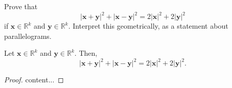 \begin{exercise}
	Prove that
	\begin{equation*}
	\left|\textbf{x}+\textbf{y}\right|^2+\left|\textbf{x}-\textbf{y}\right|^2=2\left|\textbf{x}\right|^2+2\left|\textbf{y}\right|^2
	\end{equation*}
	if $\textbf{x}\in\mathbb{R}^k$ and $\textbf{y}\in\mathbb{R}^k$. Interpret this geometrically, as a statement about parallelograms.
\end{exercise}
\begin{proposition}
	Let $\textbf{x}\in\mathbb{R}^k$ and $\textbf{y}\in\mathbb{R}^k$. Then,
	\begin{equation*}
	\left|\textbf{x}+\textbf{y}\right|^2+\left|\textbf{x}-\textbf{y}\right|^2=2\left|\textbf{x}\right|^2+2\left|\textbf{y}\right|^2.
	\end{equation*}
\end{proposition}
\begin{proof}
	content...
\end{proof}
